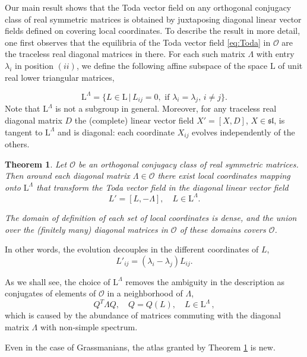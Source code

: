 \documentclass[reqno]{amsart}
\renewcommand{\sl}{\mathfrak{sl}}
\newcommand{\cO}{\mathcal{O}}
\renewcommand{\L}{\mathrm{L}}
\newtheorem{theorem}{Theorem}
\theoremstyle{definition} %
\begin{document}
Our main result shows that the Toda vector field on any orthogonal conjugacy class of real symmetric matrices is obtained by juxtaposing diagonal linear vector fields defined on covering local coordinates.
To describe the result in more detail, one first observes that the equilibria of the Toda vector field \eqref{eq:Toda} in $\mathcal{O}$ are the traceless real  diagonal matrices in there. For each such matrix $\Lambda$ with entry $\lambda_i$ in  position $(ii)$, 
we define the following affine subspace of the space $\L$ of  unit real lower triangular  matrices,

\begin{equation}\label{eq:chart-domain}
 \L^\Lambda=\{L\in \L\,|\, L_{ij}=0,\,\,\mathrm{if}\,\,\lambda_i=\lambda_j,\,i\neq j\}.
\end{equation}
 Note that $\L^\Lambda$ is not a subgroup in general. 
 Moreover,
 for any traceless real diagonal matrix $D$ the (complete) linear vector field $X'=[X,D]$, $X\in \sl$, is tangent to $\L^\Lambda$ and is diagonal: each coordinate $X_{ij}$ evolves independently of the others.



\begin{theorem}\label{thm:main} Let  $\cO$ be an orthogonal conjugacy class of real symmetric matrices.
	Then around each diagonal matrix $\Lambda\in \cO$ there exist local coordinates mapping onto $\L^\Lambda$
that transform the Toda vector field in the  diagonal linear  vector field
  \begin{equation}\label{eq:Toda-coordinates}
  L'=[L,-\Lambda],\quad L\in \L^\Lambda.
  \end{equation}

The domain of definition of each set of local coordinates is dense, and the union over the (finitely many) diagonal matrices in $\cO$ of these domains covers $\cO$.
\end{theorem}

 In other words, the evolution decouples in the different coordinates of $L$,
 \[L'_{ij}=(\lambda_i-\lambda_j)L_{ij}.\]
 
 As we shall see, the choice of $\L^\Lambda$ removes the ambiguity in the description as conjugates of elements of $\cO$ in a neighborhood of $\Lambda$, 
 \[ Q^T \Lambda Q,\quad Q=Q(L),\quad L\in \L^\Lambda \, ,\] 
 which is caused by the abundance of matrices commuting with the diagonal matrix $\Lambda$ with non-simple spectrum. 
 
 Even in the case of Grassmanians, the atlas granted by Theorem \ref{thm:main} is new.
\end{document}

